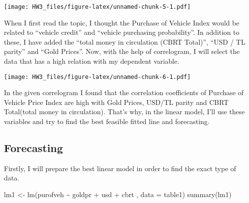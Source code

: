 \documentclass[
]{article}
\newenvironment{Shaded}{\begin{snugshade}}{\end{snugshade}}
\newcommand{\AttributeTok}[1]{\textcolor[rgb]{0.77,0.63,0.00}{#1}}
\newcommand{\CommentTok}[1]{\textcolor[rgb]{0.56,0.35,0.01}{\textit{#1}}}
\newcommand{\FunctionTok}[1]{\textcolor[rgb]{0.00,0.00,0.00}{#1}}
\newcommand{\NormalTok}[1]{#1}
\newcommand{\OtherTok}[1]{\textcolor[rgb]{0.56,0.35,0.01}{#1}}
\newcommand{\SpecialCharTok}[1]{\textcolor[rgb]{0.00,0.00,0.00}{#1}}
\newcommand{\StringTok}[1]{\textcolor[rgb]{0.31,0.60,0.02}{#1}}
\begin{document}
\texttt{[image: HW3\_files/figure-latex/unnamed-chunk-5-1.pdf]}

When I first read the topic, I thought the Purchase of Vehicle Index
would be related to ``vehicle credit'' and ``vehicle purchasing
probability''. In addition to these, I have added the ``total money in
circulation (CBRT Total)'', ``USD / TL parity'' and ``Gold Prices''.
Now, with the help of correlogram, I will select the data that has a
high relation with my dependent variable.

\begin{Shaded}
\end{Shaded}

\texttt{[image: HW3\_files/figure-latex/unnamed-chunk-6-1.pdf]}

In the given correlogram I found that the correlation coefficients of
Purchase of Vehicle Price Index are high with Gold Prices, USD/TL parity
and CBRT Total(total money in circulation). That's why, in the linear
model, I'll use these variables and try to find the best feasible fitted
line and forecasting.

\hypertarget{forecasting}{%
\subsection{Forecasting}\label{forecasting}}

Firstly, I will prepare the best linear model in order to find the exact
type of data.

\begin{Shaded}
\begin{Highlighting}[]
\NormalTok{lm1 }\OtherTok{\textless{}{-}} \FunctionTok{lm}\NormalTok{(purofveh }\SpecialCharTok{\textasciitilde{}}\NormalTok{ goldpr }\SpecialCharTok{+}\NormalTok{ usd }\SpecialCharTok{+}\NormalTok{ cbrt , }\AttributeTok{data =}\NormalTok{ table1)}
\FunctionTok{summary}\NormalTok{(lm1)}
\end{Highlighting}
\end{Shaded}
\end{document}
